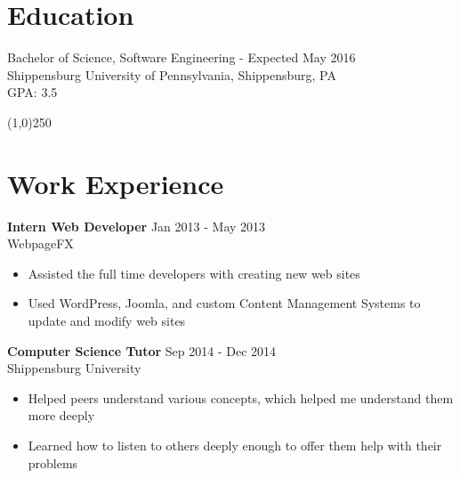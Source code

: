 \documentclass[margin,line, 11pt]{resume}
\begin{document}
\address{ \textbf {920 Macungie Avenue \\ Emmaus, PA 18049 \\ 484-602-6989}}
\address{ \textbf {GitHub: ChrisHersh \\ Chris@ChrisHersh.com}}
\begin{resume}


    \section{\mysidestyle \textbf {Education}}
    Bachelor of Science, Software Engineering - Expected May 2016 		\vspace{1mm}\\
    Shippensburg University of Pennsylvania, Shippensburg, PA 	\vspace{1mm}\\
    GPA: 3.5							
    				

    \vspace{-5mm}
    \line(1,0){250}
     \vspace{-4mm}



    \section{\mysidestyle \textbf {Work Experience}}
    
    \textbf{Intern Web Developer}	\hfill Jan 2013 - May 2013  \vspace{1.5mm}\\
    WebpageFX
    \begin{itemize}
      \item Assisted the full time developers with creating new web sites
      \item Used WordPress, Joomla, and custom Content Management Systems to update and modify web sites
    \end{itemize}
    
    \textbf{Computer Science Tutor} 	\hfill Sep 2014 - Dec 2014 \vspace{1.5mm}\\
    Shippensburg University 
     \begin{itemize}
       \item Helped peers understand various concepts, which helped me understand them more deeply
       \item Learned how to listen to others deeply enough to offer them help with their problems
     \end{itemize}
    

\end{resume}
\end{document}
